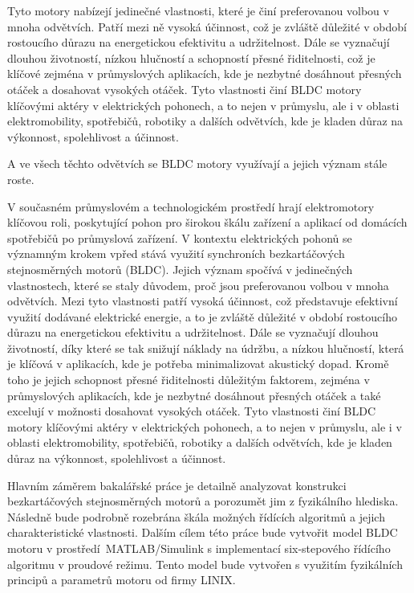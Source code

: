   Tyto motory nabízejí jedinečné vlastnosti, které je činí preferovanou volbou v mnoha odvětvích. 
  Patří mezi ně vysoká účinnost, což je zvláště důležité v období rostoucího důrazu na energetickou 
  efektivitu a udržitelnost. Dále se vyznačují dlouhou životností, nízkou hlučností a schopností 
  přesné řiditelnosti, což je klíčové zejména v průmyslových aplikacích, kde je nezbytné dosáhnout 
  přesných otáček a dosahovat vysokých otáček. Tyto vlastnosti činí BLDC motory klíčovými aktéry 
  v elektrických pohonech, a to nejen v průmyslu, ale i v oblasti elektromobility, spotřebičů, robotiky
   a dalších odvětvích, kde je kladen důraz na výkonnost, spolehlivost a účinnost.

A ve všech těchto odvětvích se BLDC motory využívají a 
jejich význam stále roste.


V současném průmyslovém a technologickém prostředí hrají elektromotory klíčovou roli, poskytující pohon pro širokou 
škálu zařízení a aplikací od domácích spotřebičů po průmyslová zařízení. V kontextu elektrických pohonů se významným krokem 
vpřed stává využití synchroních bezkartáčových stejnosměrných motorů (BLDC). Jejich význam spočívá 
v jedinečných vlastnostech, které se staly důvodem, proč jsou preferovanou volbou v mnoha odvětvích. 
Mezi tyto vlastnosti patří vysoká účinnost, což představuje efektivní využití dodávané elektrické energie, a to je zvláště 
důležité v období rostoucího důrazu na energetickou efektivitu a udržitelnost. Dále se vyznačují dlouhou životností, díky které se
 tak snižují náklady na údržbu, a nízkou hlučností, která je klíčová v aplikacích, kde je potřeba minimalizovat akustický dopad. 
Kromě toho je jejich schopnost přesné řiditelnosti důležitým faktorem, zejména v průmyslových aplikacích, kde je nezbytné 
dosáhnout přesných otáček a také excelují v možnosti dosahovat vysokých otáček. Tyto vlastnosti činí BLDC motory klíčovými aktéry v elektrických pohonech, a to 
nejen v průmyslu, ale i v oblasti elektromobility, spotřebičů, robotiky a dalších odvětvích, kde je kladen důraz na 
výkonnost, spolehlivost a účinnost.

Hlavním záměrem bakalářské práce je detailně analyzovat konstrukci bezkartáčových stejnosměrných motorů a porozumět 
jim z fyzikálního hlediska. Následně bude podrobně rozebrána škála možných řídících algoritmů a jejich charakteristické
vlastnosti. Dalším cílem této práce bude vytvořit model BLDC motoru v prostředí~\nobreak{}MATLAB/Simulink s implementací \nobreak{}six-stepového
řídícího algoritmu v proudové režimu. Tento model bude vytvořen s využitím fyzikálních principů a parametrů motoru od 
firmy LINIX.

